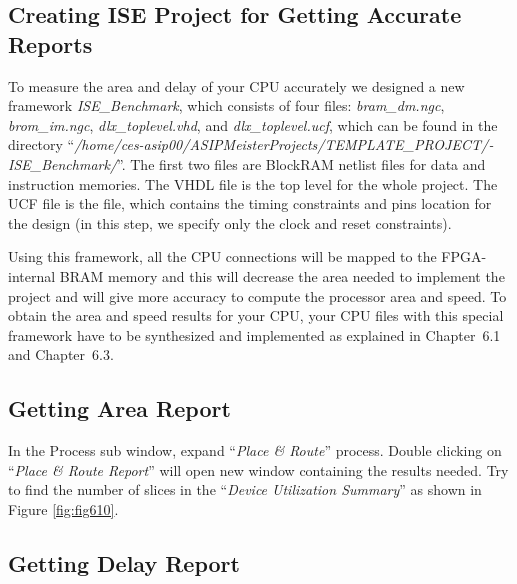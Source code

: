 \hypertarget{creating-ise-project-for-getting-accurate-reports}{%
\subsection{Creating ISE Project for Getting Accurate
Reports}\label{creating-ise-project-for-getting-accurate-reports}}

To measure the area and delay of your CPU accurately we designed a new
framework \emph{ISE\_Benchmark}, which consists of four files:
\emph{bram\_dm.ngc}, \emph{brom\_im.ngc}, \emph{dlx\_toplevel.vhd}, and
\emph{dlx\_toplevel.ucf}, which can be found in the directory
``\emph{/home/ces-asip00/­ASIPMeisterProjects/­TEMPLATE\_PROJECT/­ISE\_­Benchmark/}''.
The first two files are BlockRAM netlist files for data and instruction
memories. The VHDL file is the top level for the whole project. The UCF
file is the file, which contains the timing constraints and pins
location for the design (in this step, we specify only the clock and
reset constraints).

Using this framework, all the CPU connections will be mapped to the
FPGA-internal BRAM memory and this will decrease the area needed to
implement the project and will give more accuracy to compute the
processor area and speed. To obtain the area and speed results for your
CPU, your CPU files with this special framework have to be synthesized
and implemented as explained in Chapter~6.1 and Chapter~6.3.

\hypertarget{getting-area-report}{%
\subsection{Getting Area Report}\label{getting-area-report}}

In the Process sub window, expand ``\emph{Place \& Route}'' process.
Double clicking on ``\emph{Place \& Route Report}'' will open new window
containing the results needed. Try to find the number of slices in the
``\emph{Device Utilization Summary}'' as shown in
Figure \ref{fig:fig610}.

\hypertarget{getting-delay-report}{%
\subsection{Getting Delay Report}\label{getting-delay-report}}

